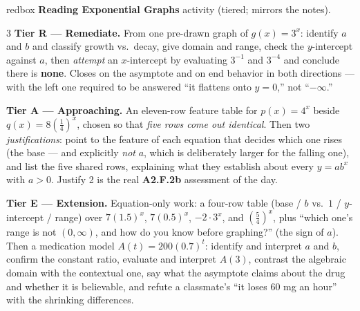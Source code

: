 \documentclass[10pt]{article}
\begin{document}
\begin{skillbox}{redbox}
\textbf{Reading Exponential Graphs} activity (tiered; mirrors the notes).
\begin{multicols}{3}
\textbf{Tier R --- Remediate.} From one pre-drawn graph of $g(x)=3^{x}$: identify $a$ and $b$ and
classify growth vs.\ decay, give domain and range, check the $y$-intercept against $a$, then
\emph{attempt} an $x$-intercept by evaluating $3^{-1}$ and $3^{-4}$ and conclude there is
\textbf{none}. Closes on the asymptote and on end behavior in both directions --- with the left one
required to be answered ``it flattens onto $y=0$,'' not ``$-\infty$.''

\columnbreak
\textbf{Tier A --- Approaching.} An eleven-row feature table for $p(x)=4^{x}$ beside
$q(x)=8\left(\frac14\right)^{x}$, chosen so that \emph{five rows come out identical}. Then two
\emph{justifications}: point to the feature of each equation that decides which one rises (the base
--- and explicitly \emph{not} $a$, which is deliberately larger for the falling one), and list the
five shared rows, explaining what they establish about every $y=ab^{x}$ with $a>0$. Justify 2 is the
real \textbf{A2.F.2b} assessment of the day.

\columnbreak
\textbf{Tier E --- Extension.} Equation-only work: a four-row table (base / $b$ vs.\ $1$ /
$y$-intercept / range) over $7(1.5)^{x}$, $7(0.5)^{x}$, $-2\cdot3^{x}$, and $\left(\frac54\right)^{x}$,
plus ``which one's range is not $(0,\infty)$, and how do you know before graphing?'' (the sign of
$a$). Then a medication model $A(t)=200(0.7)^{t}$: identify and interpret $a$ and $b$, confirm the
constant ratio, evaluate and interpret $A(3)$, contrast the algebraic domain with the contextual
one, say what the asymptote claims about the drug and whether it is believable, and refute a
classmate's ``it loses 60 mg an hour'' with the shrinking differences.
\end{multicols}
\end{skillbox}
\end{document}
